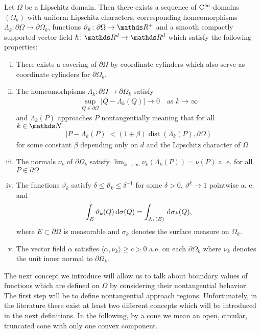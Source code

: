 \begin{thm}[Ne\v{c}as, Verchota]
  \label{thm:smoothApproximation}
  Let $\Omega$ be a Lipschitz domain.
  Then there exists a sequence of $\mathrm{C}^\infty$-domains $(\Omega_k)$ with uniform Lipschitz characters, corresponding homeomorphisms $\Lambda_k \colon \partial\Omega \to \partial\Omega_k$, functions $\vartheta_k \colon \partial\Omega \to \R^+$ and a smooth compactly supported vector field $h \colon \R^d \to \R^d$ which satisfy the following properties:
  \begin{enumerate}[i)]
    \item There exists a covering of $\partial\Omega$ by coordinate cylinders which also serve as coordinate cylinders for $\partial\Omega_k$.
    \item The homeomorhpisms $\Lambda_k \colon \partial \Omega \to \partial\Omega_k$ satisfy
      \begin{align*}
        \sup_{Q \in \partial\Omega} |Q - \Lambda_k(Q)| \to 0\quad\text{as } k \to \infty
      \end{align*}
      and $\Lambda_k(P)$ approaches $P$ nontangentially meaning that for all $k \in \N$
      \begin{align*}
        | P - \Lambda_k(P) | < (1 + \beta) \operatorname{dist}(\Lambda_k(P), \partial\Omega)
      \end{align*}
      for some constant $\beta$ depending only on $d$ and the Lipschitz character of $\Omega$.
    \item The normals $\nu_k$ of $\partial\Omega_k$ satisfy $\lim_{k \to \infty} \nu_k(\Lambda_k(P)) = \nu(P)$ a. e. for all $P \in \partial\Omega$
    \item The functions $\vartheta_k$ satisfy $\delta \leq \vartheta_k \leq \delta^{-1}$ for some $\delta > 0$, $\vartheta^k \to 1$ pointwise a. e. and
      \begin{align*}
        \int_E \vartheta_k(Q) \, {\operatorname{d}\!{\sigma}}(Q) = \int_{\Lambda_k(E)} \, {\operatorname{d}\!{\sigma}}_k(Q),
      \end{align*}
      where $E \subset \partial \Omega$ is measurable and $\sigma_k$ denotes the surface measure on $\Omega_k$.
    \item The vector field $\alpha$ satisfies $\langle \alpha, \nu_k \rangle \geq c > 0$ a.e. on each $\partial\Omega_k$ where $\nu_k$ denotes the unit inner normal to $\partial\Omega_k$.
  \end{enumerate}
\end{thm}

The next concept we introduce will allow us to talk about boundary values of functions which are defined on $\Omega$ by considering their nontangential behavior.
The first step will be to define nontangential approach regions.
Unfortunately, in the literature there exist at least two different concepts which will be introduced in the next definitions.
  In the following, by a cone we mean an open, circular, truncated cone with only one convex component.

